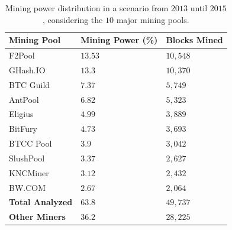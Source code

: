 \documentclass[USenglish]{uit-thesis}
\begin{document}
\begin{table}
	\centering
	\caption{Mining power distribution in a scenario from $2013$ until $2015$,
		considering the $10$ major mining pools.}
	\label{tab:miner_share_2015}
	\begin{tabular}{|p{3.3cm}|p{3.3cm}|p{3.3cm}|} \hline
		\textbf{Mining Pool}&\textbf{Mining Power (\%)}& \textbf{Blocks Mined}\\
		\hline
		\rowcolor{F2Pool}
		F2Pool&$13.53$&$10,548$\\
		\hline
		GHash.IO&$13.3$&$10,370$\\
		\hline
		BTC Guild&$7.37$&$5,749$\\
		\hline
		\rowcolor{AntPool}
		AntPool&$6.82$&$5,323$\\
		\hline
		Eligius&$4.99$&$3,889$\\
		\hline
		\rowcolor{BitFury}
		BitFury&$4.73$&$3,693$\\
		\hline
		\rowcolor{BTCC Pool}
		BTCC Pool&$3.9$&$3,042$\\
		\hline
		\rowcolor{SlushPool}
		SlushPool&$3.37$&$2,627$\\
		\hline
		KNCMiner&$3.12$&$2,432$\\
		\hline
		\rowcolor{BW.COM}
		BW.COM&$2.67$&$2,064$\\
		\hline
		\rowcolor{TablesColor}
		\textbf{Total Analyzed}&$63.8$&$49,737$\\
		\hline
		\textbf{Other Miners}&$36.2$&$28,225$\\
		\hline
	\end{tabular}
\end{table}
\end{document}
